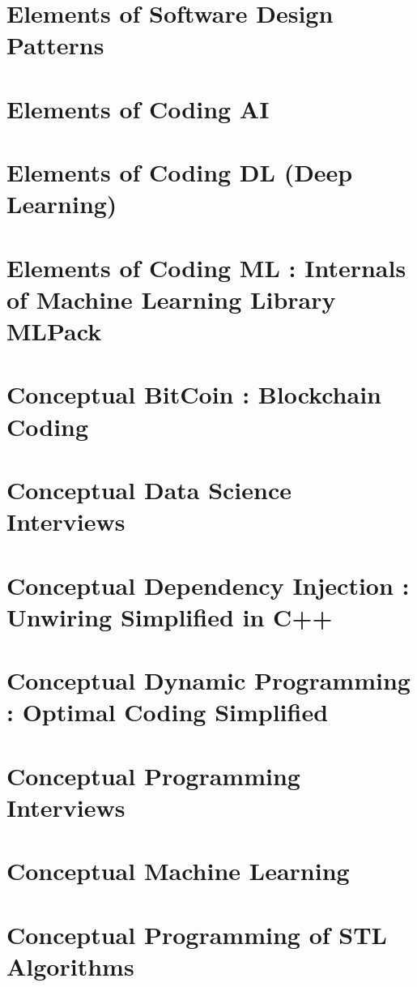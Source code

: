 \documentclass[makeidx, 12pt, oneside, onecolumn, openright, final, svgnames, dvipsnames, extrafontsizes]{memoir}
\theoremstyle{problemstyle}
\begin{document}
\chapter{Elements of Software Design Patterns}


\chapter{Elements of Coding AI}

\chapter{Elements of Coding DL (Deep Learning)}

\chapter{Elements of Coding ML : Internals of Machine Learning Library MLPack}

\chapter{Conceptual BitCoin : Blockchain Coding}

\chapter{Conceptual Data Science Interviews}

\chapter{Conceptual Dependency Injection : Unwiring Simplified in C++}

\chapter{Conceptual Dynamic Programming : Optimal Coding Simplified}

\chapter{Conceptual Programming Interviews}

\chapter{Conceptual Machine Learning}

\chapter{Conceptual Programming of STL Algorithms}
\end{document}
